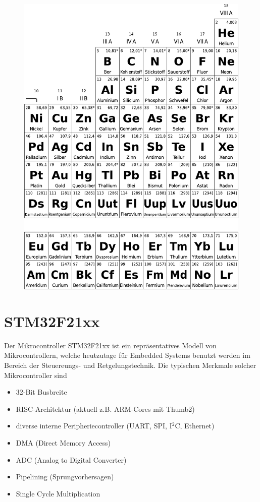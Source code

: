 \begin{appendices}
	\begin{figure}
	\centering
	\includegraphics[width=\textwidth]{periodensystem_2.pdf}
	\end{figure}

	\chapter{STM32F21xx}\label{sec:stm32f21xx}
	Der Mikrocontroller STM32F21xx ist ein repräsentatives Modell von
	Mikrocontrollern, welche heutzutage für Embedded Systems benutzt 
	werden im Bereich der Steuereungs- und Retgelungstechnik. Die 
	typischen Merkmale solcher Mikrocontroller sind
	\begin{itemize}
		\item 32-Bit Busbreite
		\item RISC-Architektur (aktuell z.B. ARM-Cores mit Thumb2)
		\item diverse interne Peripheriecontroller (UART, SPI, I$^2$C, Ethernet)
		\item DMA (Direct Memory Access)
		\item ADC (Analog to Digital Converter)
		\item Pipelining (Sprungvorhersagen)
		\item Single Cycle Multiplication
	\end{itemize}


\end{appendices}
